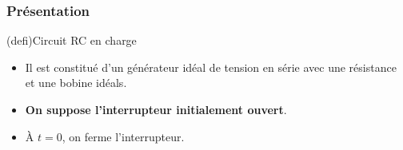 \documentclass[../../main/main.tex]{subfiles}
\begin{document}
\subsubsection{Présentation}
\begin{tcb*}[sidebyside, righthand ratio=.30](defi){Circuit RC en charge}
  \begin{itemize}
    \item Il est constitué d'un générateur idéal de tension en série avec une
          résistance et une bobine idéals.
    \item \textbf{On suppose l'interrupteur initialement ouvert}.
    \item À $t=0$, on ferme l'interrupteur.
  \end{itemize}
\tcblower
  \begin{center}
    \label{fig:circ_rl-start}
  \end{center}
\end{tcb*}
\end{document}
